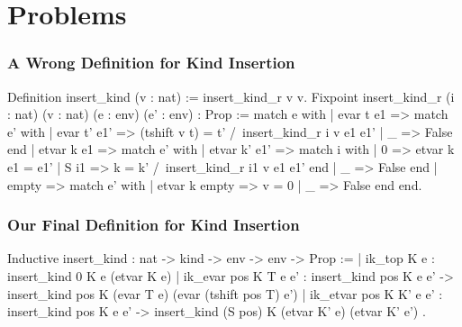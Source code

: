 \documentclass{beamer}
\begin{document}
\section{Problems}

\begin{frame}[fragile]
\frametitle{A Wrong Definition for Kind Insertion}

\begin{pyglist}[fontsize=\scriptsize]
Definition insert_kind (v : nat) := insert_kind_r v v.
Fixpoint insert_kind_r (i : nat) (v : nat) (e : env) (e' : env) : Prop :=
match e with
| evar t e1 => match e' with
               | evar t' e1' =>
                   (tshift v t) = t' /\ insert_kind_r i v e1 e1'
               | _ => False
               end
| etvar k e1 => match e' with
                | etvar k' e1' => match i with
                                  | 0 => etvar k e1 = e1'
                                  | S i1 =>
                                      k = k' /\ insert_kind_r i1 v e1 e1'
                                  end
                | _ => False
                end
  | empty => match e' with
             | etvar k empty => v = 0
             | _ => False
             end
end.
\end{pyglist}

\end{frame}

\begin{frame}[fragile]
\frametitle{Our Final Definition for Kind Insertion}

\begin{pyglist}
Inductive insert_kind : nat -> kind -> env -> env -> Prop :=
| ik_top K e :
    insert_kind 0 K e (etvar K e)
| ik_evar pos K T e e' :
    insert_kind pos K e e' ->
    insert_kind pos K (evar T e) (evar (tshift pos T) e')
| ik_etvar pos K K' e e' :
    insert_kind pos K e e' ->
    insert_kind (S pos) K (etvar K' e) (etvar K' e')
.
\end{pyglist}

\end{frame}

\section*{}
\end{document}
